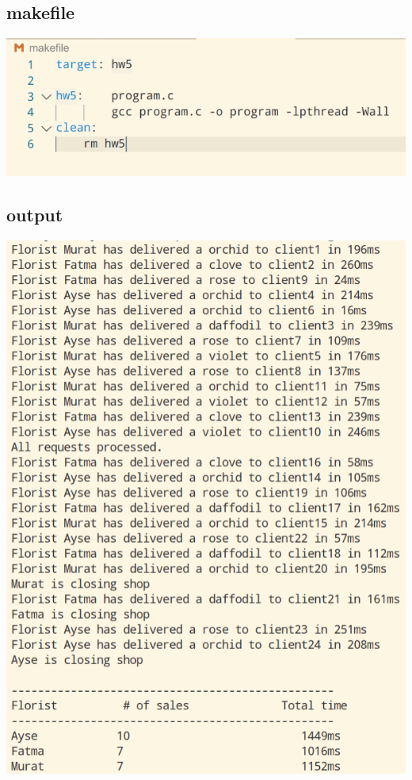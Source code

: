 \documentclass{article}
\begin{document}
    \subsection{makefile}
    \includegraphics{makefile.png}
    
    \subsection{output}
    \includegraphics{output.png}
\end{document}

